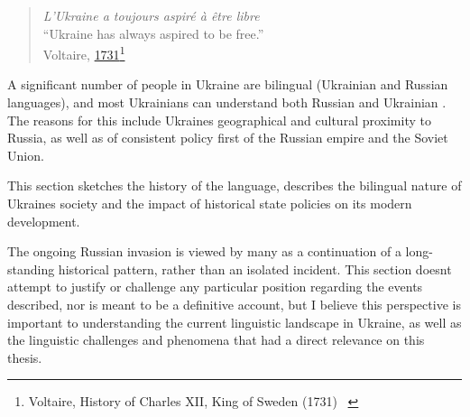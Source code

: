 \begin{quote}
\emph{L'Ukraine a toujours aspiré à être libre}\\
``Ukraine has always aspired to be free.'' \\ Voltaire, \href{https://books.google.com.ua/books?id=Lh8TAAAAQAAJ&pg=PA275&lpg=PA275&dq=\%22L\%E2\%80\%99Ukraine+a+toujours+aspir\%C3\%A9+\%C3\%A0+\%C3\%AAtre+libre\%22&source=bl&ots=gvCwzOT0nI&sig=ACfU3U2PCd60vC7uxL9hCteT47A0Iiq8og&hl=en&sa=X&ved=2ahUKEwjjuNuwqOb0AhUhpIsKHeHsCQcQ6AF6BAgUEAM\#v=onepage&q=\%22L\%E2\%80\%99Ukraine\%20a\%20toujours\%20aspir\%C3\%A9\%20\%C3\%A0\%20\%C3\%AAtre\%20libre\%22&f=false}{1731}\footnote{Voltaire, History of Charles XII, King of Sweden (1731)
~\cite{1817oeuvres}}
\end{quote}

A significant number of people in Ukraine are bilingual (Ukrainian and
Russian languages), and most Ukrainians can understand both Russian and
Ukrainian \cite{kulyk2018shedding}.\\
The reasons for this include Ukraine\textquotesingle s geographical and
cultural proximity to Russia, as well as of consistent policy first of
the Russian empire and the Soviet Union.

This section sketches the history of the language, describes the
bilingual nature of Ukraine\textquotesingle s society and the impact of
historical state policies on its modern development.

The ongoing Russian invasion is viewed by many as a continuation of a
long-standing historical pattern, rather than an isolated incident. This
section doesn\textquotesingle t attempt to justify or challenge any
particular position regarding the events described, nor is meant to be a
definitive account, but I believe this perspective is important to
understanding the current linguistic landscape in Ukraine, as well as
the linguistic challenges and phenomena that had a direct relevance on
this thesis. 

